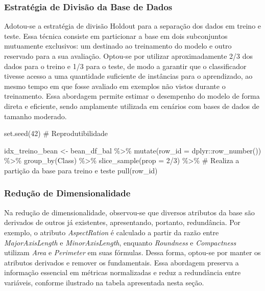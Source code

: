 \documentclass[
  letterpaper,
  DIV=11,
  numbers=noendperiod]{scrartcl}
\newenvironment{Shaded}{\begin{snugshade}}{\end{snugshade}}
\newcommand{\AttributeTok}[1]{\textcolor[rgb]{0.40,0.45,0.13}{#1}}
\newcommand{\CommentTok}[1]{\textcolor[rgb]{0.37,0.37,0.37}{#1}}
\newcommand{\DecValTok}[1]{\textcolor[rgb]{0.68,0.00,0.00}{#1}}
\newcommand{\FunctionTok}[1]{\textcolor[rgb]{0.28,0.35,0.67}{#1}}
\newcommand{\NormalTok}[1]{\textcolor[rgb]{0.00,0.23,0.31}{#1}}
\newcommand{\OtherTok}[1]{\textcolor[rgb]{0.00,0.23,0.31}{#1}}
\newcommand{\SpecialCharTok}[1]{\textcolor[rgb]{0.37,0.37,0.37}{#1}}
\begin{document}
\subsubsection{Estratégia de Divisão da Base de
Dados}\label{estratuxe9gia-de-divisuxe3o-da-base-de-dados}

Adotou-se a estratégia de divisão Holdout para a separação dos dados em
treino e teste. Essa técnica consiste em particionar a base em dois
subconjuntos mutuamente exclusivos: um destinado ao treinamento do
modelo e outro reservado para a sua avaliação. Optou-se por utilizar
aproximadamente 2/3 dos dados para o treino e 1/3 para o teste, de modo
a garantir que o classificador tivesse acesso a uma quantidade
suficiente de instâncias para o aprendizado, ao mesmo tempo em que fosse
avaliado em exemplos não vistos durante o treinamento. Essa abordagem
permite estimar o desempenho do modelo de forma direta e eficiente,
sendo amplamente utilizada em cenários com bases de dados de tamanho
moderado.

\begin{Shaded}
\begin{Highlighting}[]
\FunctionTok{set.seed}\NormalTok{(}\DecValTok{42}\NormalTok{) }\CommentTok{\# Reprodutibilidade}

\NormalTok{idx\_treino\_bean }\OtherTok{\textless{}{-}}\NormalTok{ bean\_df\_bal }\SpecialCharTok{\%\textgreater{}\%}
  \FunctionTok{mutate}\NormalTok{(}\AttributeTok{row\_id =}\NormalTok{ dplyr}\SpecialCharTok{::}\FunctionTok{row\_number}\NormalTok{()) }\SpecialCharTok{\%\textgreater{}\%}
  \FunctionTok{group\_by}\NormalTok{(Class) }\SpecialCharTok{\%\textgreater{}\%}
  \FunctionTok{slice\_sample}\NormalTok{(}\AttributeTok{prop =} \DecValTok{2}\SpecialCharTok{/}\DecValTok{3}\NormalTok{) }\SpecialCharTok{\%\textgreater{}\%} \CommentTok{\# Realiza a partição da base para treino e teste}
  \FunctionTok{pull}\NormalTok{(row\_id)}
\end{Highlighting}
\end{Shaded}

\subsubsection{Redução de
Dimensionalidade}\label{reduuxe7uxe3o-de-dimensionalidade}

Na redução de dimensionalidade, observou-se que diversos atributos da
base são derivados de outros já existentes, apresentando, portanto,
redundância. Por exemplo, o atributo \emph{AspectRation} é calculado a
partir da razão entre \emph{MajorAxisLength} e \emph{MinorAxisLength},
enquanto \emph{Roundness} e \emph{Compactness} utilizam \emph{Area} e
\emph{Perimeter} em suas fórmulas. Dessa forma, optou-se por manter os
atributos derivados e remover os fundamentais. Essa abordagem preserva a
informação essencial em métricas normalizadas e reduz a redundância
entre variáveis, conforme ilustrado na tabela apresentada nesta seção.
\end{document}
